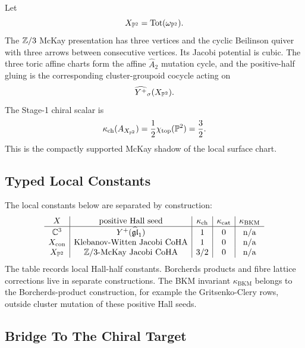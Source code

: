 Let
\[
  X_{\mathbb{P}^2}=\mathrm{Tot}(\omega_{\mathbb{P}^2}).
\]
The $\mathbb{Z}/3$ McKay presentation has three vertices and the cyclic
Beilinson quiver with three arrows between consecutive vertices.  Its
Jacobi potential is cubic.  The three toric affine charts form the
affine $\widehat A_2$ mutation cycle, and the positive-half gluing is
the corresponding cluster-groupoid cocycle acting on
\[
  \widehat{Y^{+}}_{\sigma}(X_{\mathbb{P}^2}).
\]
The Stage-1 chiral scalar is
\[
  \kappa_{\mathrm{ch}}(A_{X_{\mathbb{P}^2}})=\frac{1}{2}\chi_{\mathrm{top}}(\mathbb{P}^2)=\frac32.
\]
This is the compactly supported McKay shadow of the local surface
chart.

\subsection*{Typed Local Constants}

The local constants below are separated by construction:
\[
\begin{array}{c|c|c|c|c}
X & \text{positive Hall seed} & \kappa_{\mathrm{ch}} & \kappa_{\mathrm{cat}}
  & \kappa_{\mathrm{BKM}}\\
\hline
\mathbb{C}^3 &
Y^{+}(\widehat{\mathfrak{gl}}_1) &
1 & 0 & \mathrm{n/a}\\
X_{\mathrm{con}} &
\text{Klebanov-Witten Jacobi CoHA} &
1 & 0 & \mathrm{n/a}\\
X_{\mathbb{P}^2} &
\mathbb{Z}/3\text{-McKay Jacobi CoHA} &
3/2 & 0 & \mathrm{n/a}
\end{array}
\]
The table records local Hall-half constants.  Borcherds products and
fibre lattice corrections live in separate constructions.  The BKM
invariant $\kappa_{\mathrm{BKM}}$ belongs to the Borcherds-product
construction, for example the Gritsenko-Clery rows, outside cluster
mutation of these positive Hall seeds.

\subsection*{Bridge To The Chiral Target}


